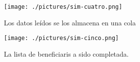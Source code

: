 \documentclass[letterpaper,12pt]{article}
\begin{document}
		\begin{figure}[!h]
  		\centering
  	  	\texttt{[image: ./pictures/sim-cuatro.png]}
	  	\caption{Los datos le\'idos se los almacena en una cola}
  		\label{fig:grafo-sim-cinco}
		\end{figure}
		
		\begin{figure}[!h]
  		\centering
  	  	\texttt{[image: ./pictures/sim-cinco.png]}
	  	\caption{La lista de beneficiaris a sido completada.}
  		\label{fig:grafo-sim-cinco}
		\end{figure}
\end{document}
